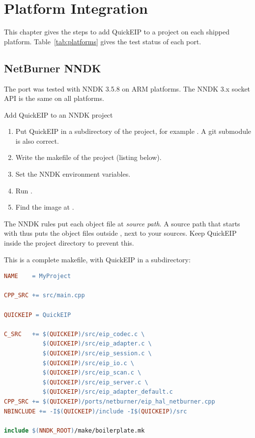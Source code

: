 \chapter{Platform Integration}\label{ch:platforms}

This chapter gives the steps to add QuickEIP to a project on each shipped
platform. Table~\ref{tab:platforms} gives the test status of each port.

\section{NetBurner NNDK}\label{sec:netburner}

The port was tested with NNDK 3.5.8 on ARM platforms. The NNDK 3.x socket
API is the same on all platforms.

\begin{procedure}{Add QuickEIP to an NNDK project}
\begin{enumerate}
  \item Put QuickEIP in a subdirectory of the project, for example
        . A git submodule is also correct.
  \item Write the makefile of the project (listing below).
  \item Set the NNDK environment variables.
  \item Run .
  \item Find the image at .
\end{enumerate}
\end{procedure}

\begin{note}
\notelabel The NNDK rules put each object file at
\textit{source path}. A source path that starts with
 thus puts the object files outside , next to your
sources. Keep QuickEIP inside the project directory to prevent this.
\end{note}

This is a complete makefile, with QuickEIP in a subdirectory:

\begin{lstlisting}[language=make]
NAME    = MyProject

CPP_SRC += src/main.cpp

QUICKEIP = QuickEIP

C_SRC   += $(QUICKEIP)/src/eip_codec.c \
           $(QUICKEIP)/src/eip_adapter.c \
           $(QUICKEIP)/src/eip_session.c \
           $(QUICKEIP)/src/eip_io.c \
           $(QUICKEIP)/src/eip_scan.c \
           $(QUICKEIP)/src/eip_server.c \
           $(QUICKEIP)/src/eip_adapter_default.c
CPP_SRC += $(QUICKEIP)/ports/netburner/eip_hal_netburner.cpp
NBINCLUDE += -I$(QUICKEIP)/include -I$(QUICKEIP)/src

include $(NNDK_ROOT)/make/boilerplate.mk
\end{lstlisting}

